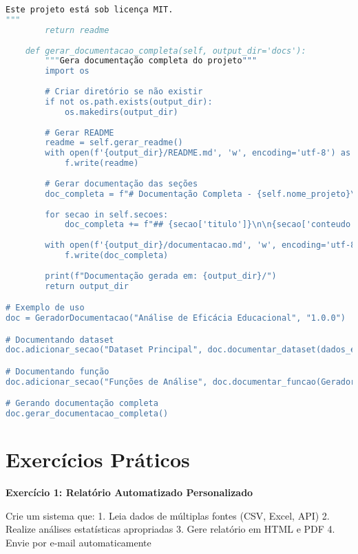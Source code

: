 \begin{pythonbox}
\begin{lstlisting}[language=Python]       
Este projeto está sob licença MIT.
"""
        return readme
    
    def gerar_documentacao_completa(self, output_dir='docs'):
        """Gera documentação completa do projeto"""
        import os
        
        # Criar diretório se não existir
        if not os.path.exists(output_dir):
            os.makedirs(output_dir)
        
        # Gerar README
        readme = self.gerar_readme()
        with open(f'{output_dir}/README.md', 'w', encoding='utf-8') as f:
            f.write(readme)
        
        # Gerar documentação das seções
        doc_completa = f"# Documentação Completa - {self.nome_projeto}\n\n"
        
        for secao in self.secoes:
            doc_completa += f"## {secao['titulo']}\n\n{secao['conteudo']}\n\n"
        
        with open(f'{output_dir}/documentacao.md', 'w', encoding='utf-8') as f:
            f.write(doc_completa)
        
        print(f"Documentação gerada em: {output_dir}/")
        return output_dir

# Exemplo de uso
doc = GeradorDocumentacao("Análise de Eficácia Educacional", "1.0.0")

# Documentando dataset
doc.adicionar_secao("Dataset Principal", doc.documentar_dataset(dados_estudo))

# Documentando função
doc.adicionar_secao("Funções de Análise", doc.documentar_funcao(GeradorRelatorio.calcular_estatisticas_descritivas))

# Gerando documentação completa
doc.gerar_documentacao_completa()
\end{lstlisting}
\end{pythonbox}

\section{Exercícios Práticos}

\begin{exercisebox}
\textbf{Exercício 1: Relatório Automatizado Personalizado}

Crie um sistema que:
1. Leia dados de múltiplas fontes (CSV, Excel, API)
2. Realize análises estatísticas apropriadas
3. Gere relatório em HTML e PDF
4. Envie por e-mail automaticamente
\end{exercisebox}

